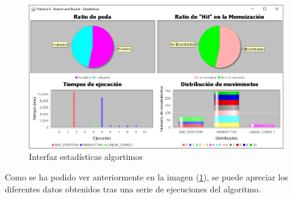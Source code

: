 \begin{figure}[!h]
    \centering
    \includegraphics[width=\linewidth]{MVC/View/img/stats-algt.png}
    \caption{Interfaz estadísticas algortimos}
    \label{fig:Ejemplo stats Algt}
\end{figure}

Como se ha podido ver anteriormente en la imagen (\ref{fig:Ejemplo stats Algt}), se puede apreciar los diferentes datos obtenidos tras una serie de ejecuciones del algoritmo.
